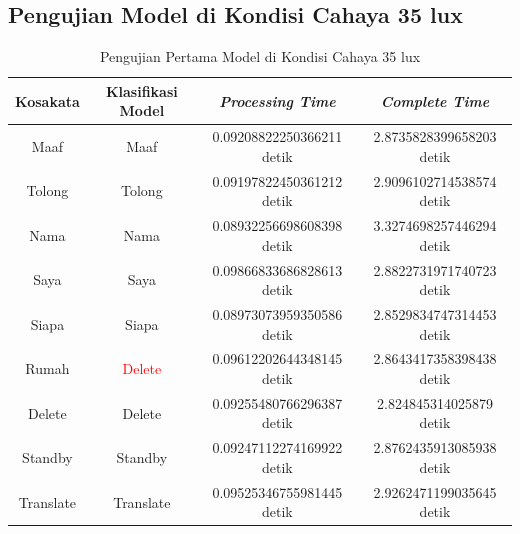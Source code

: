\newpage
\subsection{Pengujian Model di Kondisi Cahaya 35 lux}
\label{sec:analisiscahaya1}

\begin{longtable}{|c|c|c|c|}
  \caption{Pengujian Pertama Model di Kondisi Cahaya 35 lux}
  \label{tb:prediksigelap1}                                   \\
  \hline
  \rowcolor[HTML]{C0C0C0}
  \textbf{Kosakata} & \textbf{Klasifikasi Model} & \textbf{\emph{Processing Time}} & \textbf{\emph{Complete Time}}\\
  \hline
  Maaf              & Maaf                          & 0.09208822250366211 detik                           & 2.8735828399658203 detik                                  \\
  Tolong            & Tolong                        & 0.09197822450361212 detik                           & 2.9096102714538574 detik                                  \\
  Nama              & Nama                          & 0.08932256698608398 detik                           & 3.3274698257446294 detik                                  \\
  Saya              & Saya                          & 0.09866833686828613 detik                           & 2.8822731971740723 detik                                  \\
  Siapa             & Siapa                         & 0.08973073959350586 detik                           & 2.8529834747314453 detik                                  \\
  Rumah             & \textcolor{red}{Delete}       & 0.09612202644348145 detik                           & 2.8643417358398438 detik                                  \\
  Delete            & Delete                        & 0.09255480766296387 detik                           & 2.824845314025879 detik                                 \\
  Standby           & Standby                       & 0.09247112274169922 detik                           & 2.8762435913085938 detik                                  \\
  Translate         & Translate                     & 0.09525346755981445 detik                           & 2.9262471199035645 detik                                  \\
  \hline
\end{longtable}

